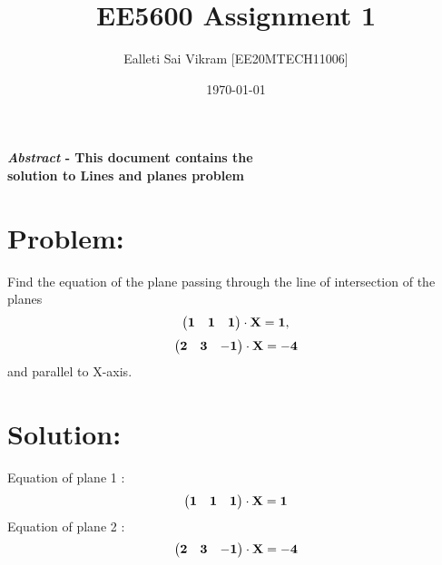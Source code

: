 \documentclass[twocolumn]{article}
\let\vec\mathbf
\begin{document}
\title{EE5600 Assignment 1}
\author{Ealleti Sai Vikram [EE20MTECH11006]}
\date{\today}
\maketitle



\textbf{\emph{Abstract} - This document contains the \\solution to Lines and planes problem}



\section*{Problem:}
Find the equation of the plane passing through
the line of intersection of the planes
\begin{equation}
\begin{pmatrix}{\bf1}&{\bf1}&{\bf1}\end{pmatrix}\cdot{\bf \vec{X}} ={\bf 1}, \nonumber
\end{equation}
\begin{equation}
\begin{pmatrix}{\bf2}&{\bf 3}&{\bf -1}\end{pmatrix}\cdot{\bf \vec{X}} ={\bf -4} \nonumber
\end{equation}
and parallel to X-axis.

\section*{Solution:}

Equation of plane 1 :
\begin{equation}\begin{pmatrix}{\bf1}&{\bf1}&{\bf1}\end{pmatrix}\cdot{\bf \vec{X}} = \bf1   \label{eqn1}
\end{equation}
Equation of plane 2 :
\begin{equation}\begin{pmatrix}{\bf2}&{\bf 3}&{\bf -1}\end{pmatrix}\cdot {\bf \vec{X}} = \bf-4 \label{eqn2}
\end{equation}
\end{document}
